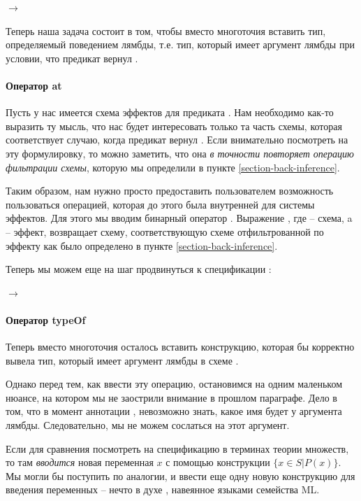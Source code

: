 {
	 $\rightarrow$  \\
}{}

Теперь наша задача состоит в том, чтобы вместо многоточия вставить тип, определяемый поведением лямбды, т.е. тип, который имеет аргумент лямбды при условии, что предикат вернул . 


\paragraph{Оператор at}

Пусть у нас имеется схема эффектов для предиката . Нам необходимо как-то выразить ту мысль, что нас будет интересовать только та часть схемы, которая соответствует случаю, когда предикат вернул . Если внимательно посмотреть на эту формулировку, то можно заметить, что она  \emph{в точности повторяет операцию фильтрации схемы}, которую мы определили в пункте \ref{section-back-inference}. 

Таким образом, нам нужно просто предоставить пользователем возможность пользоваться операцией, которая до этого была внутренней для системы эффектов. Для этого мы вводим бинарный оператор . Выражение , где  -- схема, a  -- эффект, возвращает схему, соответствующую схеме  отфильтрованной по эффекту  как было определено в пункте \ref{section-back-inference}.

Теперь мы можем еще на шаг продвинуться к спецификации :

{
	 $\rightarrow$ 
}{}


\paragraph{Оператор typeOf}

Теперь вместо многоточия осталось вставить конструкцию, которая бы корректно вывела тип, который имеет аргумент лямбды в схеме .

Однако перед тем, как ввести эту операцию, остановимся на одним маленьком нюансе, на котором мы не заострили внимание в прошлом параграфе. Дело в том, что в момент аннотации , невозможно знать, какое имя будет у аргумента лямбды. Следовательно, мы не можем сослаться на этот аргумент.

Если для сравнения посмотреть на спецификацию  в терминах теории множеств, то там \emph{вводится} новая переменная $x$ с помощью конструкции $\{ x \in S | P(x) \}$. Мы могли бы поступить по аналогии, и ввести еще одну новую конструкцию для введения переменных -- нечто в духе , навеянное языками семейства ML.

